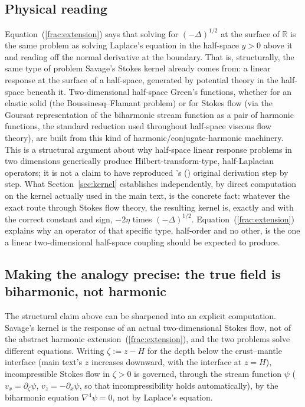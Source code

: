 \documentclass{article}
\begin{document}
\subsection{Physical reading}

Equation~(\ref{frac:extension}) says that solving for $(-\Delta)^{1/2}$ at
the surface of $\mathbb{R}$ is the same problem as solving Laplace's
equation in the half-space $y>0$ above it and reading off the normal
derivative at the boundary. That is, structurally, the same type of problem
Savage's Stokes kernel already comes from: a linear response at the surface
of a half-space, generated by potential theory in the half-space beneath it.
Two-dimensional half-space Green's functions, whether for an elastic solid
(the Boussinesq--Flamant problem) or for Stokes flow (via the Goursat
representation of the biharmonic stream function as a pair of harmonic
functions, the standard reduction used throughout half-space viscous flow
theory), are built from this kind of harmonic/conjugate-harmonic
machinery. This is a structural argument about why half-space linear
response problems in two dimensions generically produce Hilbert-transform-type,
half-Laplacian operators; it is not a claim to have reproduced
\citeauthor{savage1978asthenosphere}'s (\citeyear{savage1978asthenosphere})
original derivation step by step. What Section~\ref{sec:kernel} establishes
independently, by direct computation on the kernel actually used in the main
text, is the concrete fact: whatever the exact route through Stokes flow
theory, the resulting kernel is, exactly and with the correct constant and
sign, $-2\eta$ times $(-\Delta)^{1/2}$. Equation~(\ref{frac:extension})
explains why an operator of that specific type, half-order and no other, is
the one a linear two-dimensional half-space coupling should be expected to
produce.

\subsection{Making the analogy precise: the true field is biharmonic, not harmonic}

The structural claim above can be sharpened into an explicit computation.
Savage's kernel is the response of an actual two-dimensional Stokes flow,
not of the abstract harmonic extension~(\ref{frac:extension}), and the two
problems solve different equations. Writing $\zeta:=z-H$ for the
depth below the crust--mantle interface (main text's $z$ increases
downward, with the interface at $z=H$), incompressible Stokes flow in
$\zeta>0$ is governed, through the stream function $\psi$
($v_x=\partial_\zeta\psi$, $v_z=-\partial_x\psi$, so that incompressibility
holds automatically), by the biharmonic equation $\nabla^4\psi=0$, not by
Laplace's equation.
\end{document}

